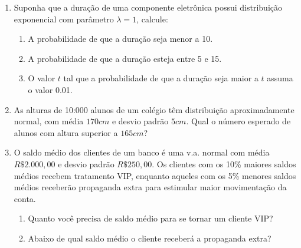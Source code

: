 \begin{enumerate}
\begin{enumerate}[label=\alph*)]
	\end{enumerate}

\setcounter{enumi}{2}
\item Suponha que a duração de uma componente eletrônica possui distribuição exponencial com parâmetro $\lambda = 1$, calcule:

	\solv{
		\[
			f(x) = \left\{
			\begin{array}{cc}
				\dfrac{1}{\lambda}e^{\frac{-x}{\lambda}}, & x>0;\\
				0, & c.c
			\end{array}\right.
			\hfill,\ \lambda = 1
		\]
	}
	\begin{enumerate}[label=\alph*)]
		\item A probabilidade de que a duração seja menor a 10.
		
		
		\item A probabilidade de que a duração esteja entre 5 e 15.
		
		
		\item O valor $t$ tal que a probabilidade de que a duração seja maior a $t$ assuma o valor 0.01.
		
	\end{enumerate}

\item As alturas de 10:000 alunos de um colégio têm distribuição aproximadamente normal, com média $170cm$ e desvio padrão $5cm$. Qual o número esperado de alunos com altura superior a $165cm$?


\setcounter{enumi}{10}
\item O saldo médio dos clientes de um banco é uma v.a. normal com média $R\$ 2.000,00$ e desvio padrão $R\$ 250,00$. Os clientes com os 10\% maiores saldos médios recebem tratamento VIP, enquanto aqueles com os 5\% menores saldos médios receberão propaganda extra para estimular maior movimentação da conta.
	\begin{enumerate}[label=\alph*)]
		\item Quanto você precisa de saldo médio para se tornar um cliente VIP?
		\item Abaixo de qual saldo médio o cliente receberá a propaganda extra?
	\end{enumerate}
\end{enumerate}